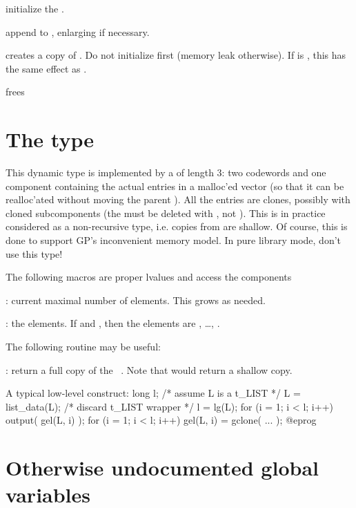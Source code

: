  initialize the  .

 append  to ,
enlarging  if necessary.

 creates a copy  of
. Do not initialize  first (memory leak otherwise). If 
 is , this has the same effect as .

 frees 

\section{The type } This dynamic type
is implemented by a  of length 3: two codewords and one component
containing the actual entries in a malloc'ed vector (so that it can be
realloc'ated without moving the parent ). All the entries are
clones, possibly with cloned subcomponents (the must be deleted with
, not ). This is in practice considered as a
non-recursive type, i.e. copies from  are shallow. Of course, this
is done to support GP's inconvenient memory model. In pure library mode,
don't use this type!

The following macros are proper lvalues and access the components

: current maximal number of elements. This grows
as needed.

: the elements. If  and
, then the elements are , \dots, .

The following routine may be useful:

: return a full copy of the ~.
Note that  would return a shallow copy.

A typical low-level construct:
\bprog
  long l;
  /* assume L is a t_LIST */
  L = list_data(L); /* discard t_LIST wrapper */
  l = lg(L);
  for (i = 1; i < l; i++) output( gel(L, i) );
  for (i = 1; i < l; i++) gel(L, i) = gclone( ... );
@eprog\noindent 

\section{Otherwise undocumented global variables}

